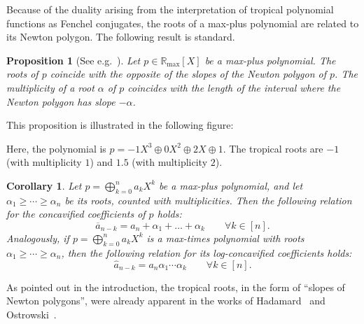 \documentclass[a4paper]{amsart}
\theoremstyle{definition}
\theoremstyle{plain}
\newtheorem{prop}[thm]{Proposition}
\newtheorem{cor}[thm]{Corollary}
\theoremstyle{remark}
\begin{document}
Because of the duality arising from the interpretation of tropical polynomial
functions as Fenchel conjugates,
the roots of a max-plus polynomial are related to its Newton polygon.
The following result is standard.
\begin{prop}[See e.g.\ {\cite[Proposition 2.10]{abg04b}}]
 Let $p \in {{\mathbb{R}_{\max}}} [X]$ be a max-plus polynomial.
 The roots of $p$ coincide with the opposite of the slopes of the Newton polygon of $p$.
 The multiplicity of a root $\alpha$ of $p$ coincides with the length of the interval
 where the Newton polygon has slope $-\alpha$. 
\end{prop}
This proposition is illustrated in the following figure:
\begin{center}
\end{center}
Here, the polynomial is $p = -1X^3 \oplus 0X^2 \oplus 2X \oplus 1$. The tropical roots are $-1$ (with multiplicity $1$) and $1.5$ (with multiplicity $2$).

\begin{cor}
 \label{tropical_vieta}
 Let $p = \bigoplus_{k=0}^n a_k X^k$ be a max-plus polynomial, and let
 $\alpha_1 {\geqslant} \cdots {\geqslant} \alpha_n$ be its roots, counted with multiplicities.
 Then the following relation for the concavified coefficients of $p$ holds:
 \[
  \overline{a}_{n-k} = a_n + \alpha_1 + \dots + \alpha_k  \qquad \forall k \in 
[n].
 \]
 Analogously, if $p = \bigoplus_{k=0}^n a_k X^k$ is a max-times polynomial
 with roots ${\alpha_1 {\geqslant} \cdots {\geqslant} \alpha_n}$,
 then the following relation for its log-concavified coefficients holds:
 \[
  \widehat{a}_{n-k} = a_n \alpha_1 \dotsm \alpha_k \qquad \forall k \in [n].
 \]
\end{cor}
As pointed out in the introduction, the tropical roots, 
in the form of ``slopes of Newton polygons'',
were already apparent in the works of Hadamard~\cite{hadamard1893}
and 
 Ostrowski~\cite{Ostrowski1}.
\end{document}
